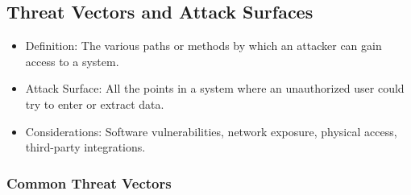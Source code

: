 \documentclass[11pt]{article}
\begin{document}
\subsection{Threat Vectors and Attack Surfaces}
\label{sec:org40b5340}
\begin{itemize}
\item Definition: The various paths or methods by which an attacker can gain access to a system.
\item Attack Surface: All the points in a system where an unauthorized user could try to enter or extract data.
\item Considerations: Software vulnerabilities, network exposure, physical access, third-party integrations.
\end{itemize}
\subsubsection{Common Threat Vectors}
\label{sec:org8545a0f}
\end{document}
